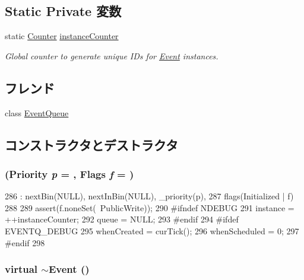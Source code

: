 \subsection*{Static Private 変数}
\begin{DoxyCompactItemize}
\item 
static \hyperlink{base_2types_8hh_ae1475755791765b8e6f6a8bb091e273e}{Counter} \hyperlink{classEvent_adffdf007f19587d7dd80ff0a81bef600}{instanceCounter}
\begin{DoxyCompactList}\small\item\em Global counter to generate unique IDs for \hyperlink{classEvent}{Event} instances. \item\end{DoxyCompactList}\end{DoxyCompactItemize}
\subsection*{フレンド}
\begin{DoxyCompactItemize}
\item 
class \hyperlink{classEvent_a3b1787a64e5e97ce075c05a58303d58c}{EventQueue}
\end{DoxyCompactItemize}


\subsection{コンストラクタとデストラクタ}
\hypertarget{classEvent_a750c02bcebb85221176ec641dd7b669b}{
\subsubsection[{Event}]{ ({\bf Priority} {\em p} = {}, \/  {\bf Flags} {\em f} = {})}}
\label{classEvent_a750c02bcebb85221176ec641dd7b669b}



\begin{DoxyCode}
286         : nextBin(NULL), nextInBin(NULL), _priority(p),
287           flags(Initialized | f)
288     {
289         assert(f.noneSet(~PublicWrite));
290 #ifndef NDEBUG
291         instance = ++instanceCounter;
292         queue = NULL;
293 #endif
294 #ifdef EVENTQ_DEBUG
295         whenCreated = curTick();
296         whenScheduled = 0;
297 #endif
298     }
\end{DoxyCode}
\hypertarget{classEvent_aa28124883bfb17601f85db7e635094b1}{
\subsubsection[{$\sim$Event}]{\setlength{\rightskip}{0pt plus 5cm}virtual $\sim${\bf Event} ()}}
\label{classEvent_aa28124883bfb17601f85db7e635094b1}



